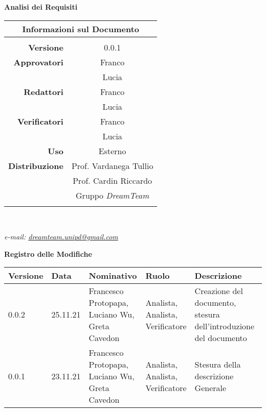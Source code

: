 \documentclass[letterpaper]{article}
\begin{document}
\begin{center}
{\Huge{\textbf{Analisi dei Requisiti}}} \\ [1cm]

\begin{table}[htbp]
\centering
\begin{tabular}{r|c}
\multicolumn{2}{c}{\textbf{Informazioni sul Documento}} \\
\hline \\
\textbf{Versione} & 0.0.1 \\ \rule{0pt}{3ex}    
\textbf{Approvatori} & Franco \\ \rule{0pt}{2ex}   
& Lucia \\ \rule{0pt}{3ex}    
\textbf{Redattori} & Franco \\ \rule{0pt}{2ex}   
& Lucia \\ \rule{0pt}{3ex}    
\textbf{Verificatori} & Franco \\ \rule{0pt}{2ex}   
& Lucia \\ \rule{0pt}{3ex}    
\textbf{Uso} & Esterno \\ \rule{0pt}{3ex}    
\textbf{Distribuzione} & Prof. Vardanega Tullio \\ \rule{0pt}{2ex}   
& Prof. Cardin Riccardo \\ \rule{0pt}{2ex}   
& Gruppo \textit{DreamTeam} \\ \rule{0pt}{0.1cm}   
\end{tabular} \\ [0.5cm]
\end{table}

\textsl{ e-mail: \href{mailto:dreamteam.unipd@gmail.com}{dreamteam.unipd@gmail.com} } \\[2cm]
\end{center}
\pagebreak



{\LARGE{\textbf{Registro delle Modifiche}}} \\

\begin{tabular}{|m{}<{\centering}|m{}<{\centering}|m{}<{\centering}|m{}<{\centering}|m{}<{\centering}|}
	\hline \rowcolor{gray!50}
	\textbf{Versione}&\textbf{Data}&\textbf{Nominativo}&\textbf{Ruolo}&\textbf{Descrizione}\\
	\hline
	0.0.2&25.11.21&\shortstack {Francesco Protopapa,\\Luciano Wu,\\Greta Cavedon}&\shortstack{Analista,\\Analista,\\Verificatore}&Creazione del documento, stesura dell’introduzione del documento\\ 
	\hline 
	0.0.1&23.11.21&\shortstack{Francesco Protopapa,\\Luciano Wu,\\Greta Cavedon}&\shortstack{Analista,\\Analista,\\Verificatore}&Stesura della descrizione Generale\\
	\hline
\end{tabular}
\end{document}
